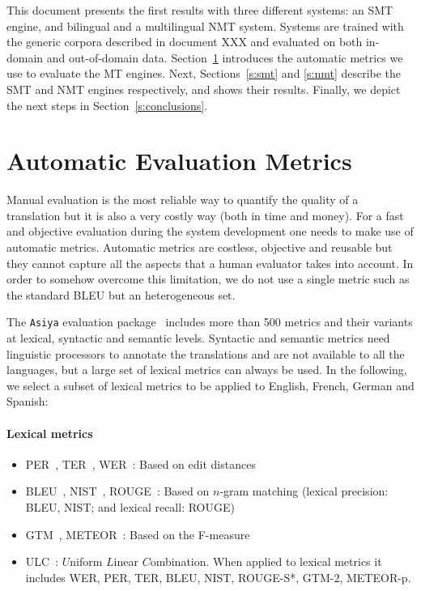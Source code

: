 \documentclass[a4paper,11pt]{article}
\begin{document}
This document presents the first results with three different systems: an SMT engine, and bilingual and a multilingual NMT system. Systems are trained with the generic corpora described in document XXX and evaluated on both in-domain and out-of-domain data. Section~\ref{s:eval} introduces the automatic metrics we use to evaluate the MT engines. Next, Sections~\ref{s:smt} and \ref{s:nmt} describe the SMT and NMT engines respectively, and shows their results. Finally, we depict the next steps in Section~\ref{s:conclusions}.


\section{Automatic Evaluation Metrics}
\label{s:eval}

Manual evaluation is the most reliable way to quantify the quality of a translation but it is also a very costly way (both in time and money). For a fast and objective evaluation during the system development one needs to make use of automatic metrics. Automatic metrics are costless, objective and reusable but they cannot capture all the aspects that a human evaluator takes into account. In order to somehow overcome this limitation, we do not use a single metric such as the standard BLEU but an heterogeneous set.

The {\tt Asiya} evaluation package~\cite{PBML_Asiya:2010, Gonzalez:2012} includes more than 500 metrics and their variants at lexical, syntactic and semantic levels. Syntactic and semantic metrics need linguistic processors to annotate the translations and are not available to all the languages, but a large set of lexical metrics can always be used. In the following, we select a subset of lexical metrics to be applied to English, French, German and Spanish:

\paragraph{Lexical metrics} 
\begin{itemize}
 \item PER~\cite{PER}, TER~\cite{TER}, WER~\cite{WER}: Based on edit distances
 \item BLEU~\cite{papineni2002}, NIST~\cite{NISTmetric}, ROUGE~\cite{ROUGE}: Based on $n$-gram matching (lexical precision: BLEU, NIST; and lexical recall: ROUGE)
 \item GTM~\cite{GTM}, METEOR~\cite{METEOR}: Based on the F-measure
 \item ULC~\cite{ULC}: $U$niform $L$inear $C$ombination. When applied to lexical metrics it includes WER, PER, TER, BLEU, NIST, 
 ROUGE-S*, GTM-2, METEOR-p. 
\end{itemize}
\end{document}
